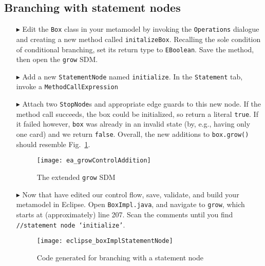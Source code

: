 \clearpage
\hypertarget{conBran vis}{}
\subsection{Branching with statement nodes}
\visHeader

\begin{itemize}
  
\item[$\blacktriangleright$] Edit the \texttt{Box} class in your metamodel by invoking the \texttt{Operations} dialogue and creating a new method called
\texttt{initalizeBox}. Recalling the sole condition of conditional branching, set its return type to \texttt{EBoolean}. Save the method, then open the
\texttt{grow} SDM.

\item[$\blacktriangleright$] Add a new \texttt{StatementNode} named \texttt{initialize}. In the \texttt{Statement} tab, invoke a \texttt{MethodCallExpression}

\item[$\blacktriangleright$] Attach two \texttt{StopNode}s and appropriate edge guards to this new node. If the method call succeeds, the box could be
initialized, so return a literal \texttt{true}. If it failed however, \texttt{box} was already in an invalid state (by, e.g., having only one card) and we
return \texttt{false}. Overall, the new additions to \texttt{box.grow()} should resemble Fig.~\ref{fig:newGrowControl}.

\begin{figure}[htp]
\begin{center}
  \texttt{[image: ea\_growControlAddition]}
  \caption{The extended \texttt{grow} SDM \update}
  \label{fig:newGrowControl}
\end{center}
\end{figure}

\item[$\blacktriangleright$] Now that have edited our control flow, save, validate, and build your metamodel in Eclipse. Open \texttt{BoxImpl.java},
and navigate to \texttt{grow}, which starts at (approximately) line 207. Scan the comments until you find \texttt{//statement node `initialize'}.

\begin{figure}[htp]
\begin{center}
  \texttt{[image: eclipse\_boxImplStatementNode]}
  \caption{Code generated for branching with a statement node}
  \label{fig:initBoxImpl}
\end{center}
\end{figure}


\end{itemize}
